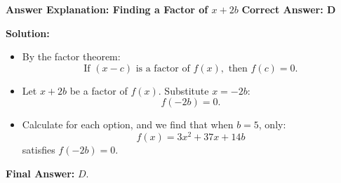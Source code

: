 \documentclass{beamer}
\begin{document}
\begin{frame}{\textbf{Answer Explanation: Finding a Factor of \( x + 2b \)}}
    \textbf{Correct Answer: \textcolor{novelPurple}{\( \mathbf{D} \)}}  

    \vspace{0.3cm}
    \textbf{Solution:}
    \begin{itemize}
        \item By the factor theorem:
        \[
        \text{If } (x - c) \text{ is a factor of } f(x), \text{ then } f(c) = 0.
        \]
        \item Let \( x + 2b \) be a factor of \( f(x) \). Substitute \( x = -2b \):
        \[
        f(-2b) = 0.
        \]
        \item Calculate for each option, and we find that when \( b = 5 \), only:
        \[
        f(x) = 3x^2 + 37x + 14b
        \]
        satisfies \( f(-2b) = 0 \).
    \end{itemize}
    \textbf{Final Answer:} \( \boxed{D} \).
\end{frame}
\end{document}
